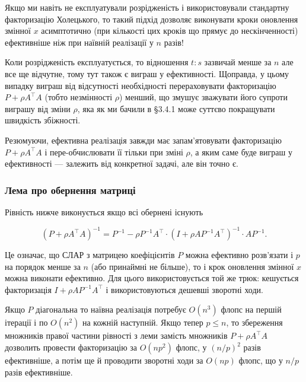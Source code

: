 \begin{example}
    Якщо ми навіть не експлуатували розрідженість і використовували стандартну факторизацію Холецького, то такий підхід дозволяє виконувати кроки оновлення змінної $x$ асимптотично (при кількості цих кроків що прямує до нескінченності) ефективніше ніж при наївній реалізації у $n$ разів!
\end{example}

\begin{remark}
    Коли розрідженість експлуатується, то відношення $t:s$ зазвичай менше за $n$ але все ще відчутне, тому тут також є виграш у ефективності. Щоправда, у цьому випадку виграш від відсутності необхідності перераховувати факторизацію $P + \rho A^\intercal A$ (тобто незмінності $\rho$) менший, що змушує зважувати його супроти виграшу від зміни $\rho$, яка як ми бачили в \S3.4.1 може суттєво покращувати швидкість збіжності.
\end{remark}

Резюмуючи, ефективна реалізація завжди має запам'ятовувати факторизацію $P + \rho A^\intercal A$ і пере-обчислювати її тільки при зміні $\rho$, а яким саме буде виграш у ефективності --- залежить від конкретної задачі, але він точно є.

\subsubsection{Лема про обернення матриці}

\begin{lemma}
    Рівність нижче виконується якщо всі обернені існують
    
    \begin{equation}
    	\left(P + \rho A^\intercal A\right)^{-1} = P^{-1} - \rho P^{-1} A^\intercal \cdot 
    	\left( I + \rho A P^{-1} A^\intercal \right)^{-1} \cdot A P^{-1}.
    \end{equation}
\end{lemma}

Це означає, що СЛАР з матрицею коефіцієнтів $P$ можна ефективно розв'язати і $p$ на порядок менше за $n$ (або принаймні не більше), то і крок оновлення змінної $x$ можна виконати ефективно. Для цього використовується той же трюк: кешується факторизація $I + \rho A P^{-1} A^\intercal$ і  використовуються дешевші зворотні ходи.

\begin{example}
    Якщо $P$ діагональна то наївна реалізація потребує $O\left(n^3\right)$ флопс на першій ітерації і по $O\left(n^2\right)$ на кожній наступній. Якщо тепер $p \le n$, то збереження множників правої частини рівності з леми замість множників $P + \rho A^\intercal A$  дозволить провести факторизацію за $O\left(np^2\right)$ флопс, у $(n / p)^2$ разів ефективніше, а потім ще й проводити зворотні ходи за $O(np)$ флопс, що у $n / p$ разів ефективніше.
\end{example}


